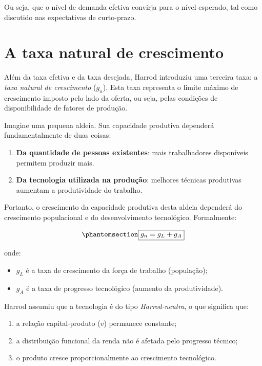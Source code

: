 \documentclass[
  brazilian,
  letterpaper,
  DIV=11,
  numbers=noendperiod]{scrreprt}
\providecommand{\tightlist}{%
  \setlength{\itemsep}{0pt}\setlength{\parskip}{0pt}}
\begin{document}
Ou seja, que o nível de demanda efetiva convirja para o nível esperado,
tal como discutido nas expectativas de curto-prazo.

\section{A taxa natural de crescimento}\label{sec-natural-harrod}

Além da taxa efetiva e da taxa desejada, Harrod introduziu uma terceira
taxa: a \emph{taxa natural de crescimento} (\(g_n\)). Esta taxa
representa o limite máximo de crescimento imposto pelo lado da oferta,
ou seja, pelas condições de disponibilidade de fatores de produção.

Imagine uma pequena aldeia. Sua capacidade produtiva dependerá
fundamentalmente de duas coisas:

\begin{enumerate}
\def\labelenumi{\arabic{enumi}.}
\tightlist
\item
  \textbf{Da quantidade de pessoas existentes}: mais trabalhadores
  disponíveis permitem produzir mais.
\item
  \textbf{Da tecnologia utilizada na produção}: melhores técnicas
  produtivas aumentam a produtividade do trabalho.
\end{enumerate}

Portanto, o crescimento da capacidade produtiva desta aldeia dependerá
do crescimento populacional e do desenvolvimento tecnológico.
Formalmente:

\begin{equation}\protect\phantomsection\label{eq-gn-harrod}{\boxed{g_n = g_L + g_A}}\end{equation}

onde:

\begin{itemize}
\tightlist
\item
  \(g_L\) é a taxa de crescimento da força de trabalho (população);
\item
  \(g_A\) é a taxa de progresso tecnológico (aumento da produtividade).
\end{itemize}

Harrod assumiu que a tecnologia é do tipo \emph{Harrod-neutra}, o que
significa que:

\begin{enumerate}
\def\labelenumi{\arabic{enumi}.}
\tightlist
\item
  a relação capital-produto (\(v\)) permanece constante;
\item
  a distribuição funcional da renda não é afetada pelo progresso
  técnico;
\item
  o produto cresce proporcionalmente ao crescimento tecnológico.
\end{enumerate}
\end{document}
